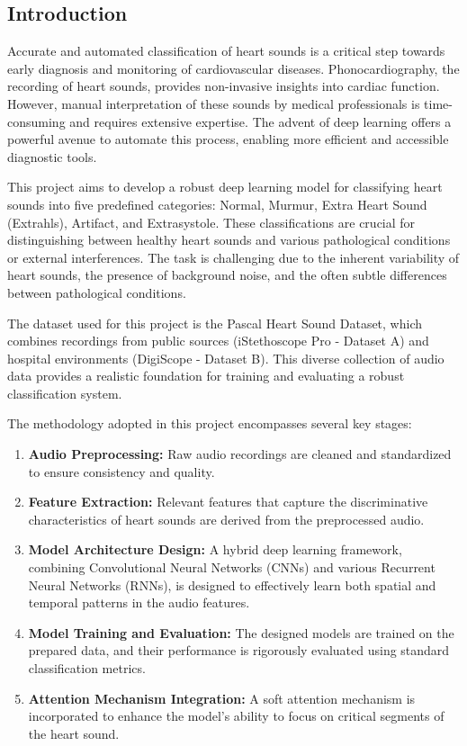 \documentclass[a4paper]{article}
\begin{document}
\begin{multicols}{2}

\section{Introduction}
Accurate and automated classification of heart sounds is a critical step towards early diagnosis and monitoring of cardiovascular diseases. Phonocardiography, the recording of heart sounds, provides non-invasive insights into cardiac function. However, manual interpretation of these sounds by medical professionals is time-consuming and requires extensive expertise. The advent of deep learning offers a powerful avenue to automate this process, enabling more efficient and accessible diagnostic tools.

This project aims to develop a robust deep learning model for classifying heart sounds into five predefined categories: Normal, Murmur, Extra Heart Sound (Extrahls), Artifact, and Extrasystole. These classifications are crucial for distinguishing between healthy heart sounds and various pathological conditions or external interferences. The task is challenging due to the inherent variability of heart sounds, the presence of background noise, and the often subtle differences between pathological conditions.

The dataset used for this project is the Pascal Heart Sound Dataset, which combines recordings from public sources (iStethoscope Pro - Dataset A) and hospital environments (DigiScope - Dataset B). This diverse collection of audio data provides a realistic foundation for training and evaluating a robust classification system.

The methodology adopted in this project encompasses several key stages:
\begin{enumerate}
    \item \textbf{Audio Preprocessing:} Raw audio recordings are cleaned and standardized to ensure consistency and quality.
    \item \textbf{Feature Extraction:} Relevant features that capture the discriminative characteristics of heart sounds are derived from the preprocessed audio.
    \item \textbf{Model Architecture Design:} A hybrid deep learning framework, combining Convolutional Neural Networks (CNNs) and various Recurrent Neural Networks (RNNs), is designed to effectively learn both spatial and temporal patterns in the audio features.
    \item \textbf{Model Training and Evaluation:} The designed models are trained on the prepared data, and their performance is rigorously evaluated using standard classification metrics.
    \item \textbf{Attention Mechanism Integration:} A soft attention mechanism is incorporated to enhance the model's ability to focus on critical segments of the heart sound.
\end{enumerate}


\end{multicols}
\end{document}
